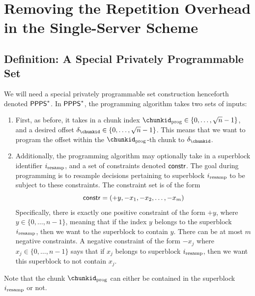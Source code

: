 \section{Removing the Repetition Overhead in the Single-Server Scheme}

\subsection{Definition: A Special Privately Programmable Set} 
We will need a special privately programmable set construction henceforth
denoted ${\sf PPPS}^*$.
In ${\sf PPPS}^*$, the programming algorithm takes
two sets of inputs:
\begin{enumerate}[leftmargin=5mm]
\item 
First, as before, it takes in a chunk index 
$\chunkid_{\rm prog} \in \{0, \ldots, \sqrt{n}-1\}$, 
and a desired offset $\delta_\chunkid \in \{0, \ldots, \sqrt{n}-1\}$.
This means that we want to program the offset within 
the $\chunkid_{\rm prog}$-th chunk to $\delta_\chunkid$. 
\item 
Additionally, the programming algorithm may optionally take in 
 a superblock identifier $i_{\rm resamp}$, 
and a set of constraints denoted ${\sf constr}$.
The goal during programming is to resample decisions pertaining
to superblock $i_{\rm resamp}$ to be subject to these constraints.
The constraint set is of the form 
$${\sf constr} = (+y, -x_1, -x_2, \ldots, -x_m)$$
Specifically, there is exactly one positive constraint
of the form $+y$, where $y \in \{0, \ldots, n-1\}$, meaning 
that if the index $y$ belongs to 
the superblock $i_{\rm resamp}$, then we want to the superblock to contain $y$. 
There can be at most $m$ negative constraints. 
A negative constraint of the form $-x_j$ where  
$x_j \in \{0, \ldots, n-1\}$
says that if $x_j$ belongs to superblock $i_{\rm resamp}$, then we want
this superblock to not contain $x_j$.
\end{enumerate}
Note that the chunk $\chunkid_{\rm prog}$
can either be contained in the superblock $i_{\rm resamp}$
or not.

